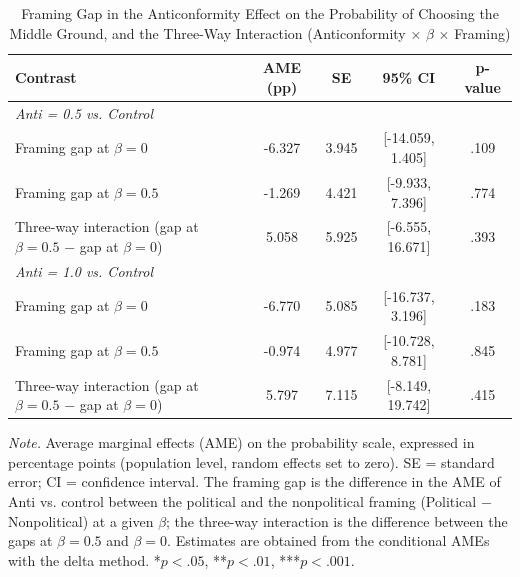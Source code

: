 \begin{table}[H]
\centering
\caption{Framing Gap in the Anticonformity Effect on the Probability of Choosing the Middle Ground, and the Three-Way Interaction (Anticonformity $\times$ $\beta$ $\times$ Framing)}
\label{tab:ame_anti_3way}
\begingroup
\footnotesize
\renewcommand{\arraystretch}{0.90}

\begin{tabularx}{\linewidth}{Xcccc}
\toprule
\textbf{Contrast} & \textbf{AME (pp)} & \textbf{SE} & \textbf{95\% CI} & \textbf{p-value} \\
\midrule
\multicolumn{5}{l}{\textit{Anti = 0.5 vs. Control}} \\
Framing gap at $\beta = 0$ & -6.327 & 3.945 & [-14.059, 1.405] & .109 \\
Framing gap at $\beta = 0.5$ & -1.269 & 4.421 & [-9.933, 7.396] & .774 \\
Three-way interaction (gap at $\beta = 0.5$ $-$ gap at $\beta = 0$) & 5.058 & 5.925 & [-6.555, 16.671] & .393 \\
\multicolumn{5}{l}{\textit{Anti = 1.0 vs. Control}} \\
Framing gap at $\beta = 0$ & -6.770 & 5.085 & [-16.737, 3.196] & .183 \\
Framing gap at $\beta = 0.5$ & -0.974 & 4.977 & [-10.728, 8.781] & .845 \\
Three-way interaction (gap at $\beta = 0.5$ $-$ gap at $\beta = 0$) & 5.797 & 7.115 & [-8.149, 19.742] & .415 \\
\bottomrule
\end{tabularx}

\vspace{0.6em}
{\footnotesize
\setlength{\baselineskip}{12pt}
\textit{Note.} Average marginal effects (AME) on the probability scale, expressed in percentage points (population level, random effects set to zero). SE = standard error; CI = confidence interval. The framing gap is the difference in the AME of Anti vs. control between the political and the nonpolitical framing (Political $-$ Nonpolitical) at a given $\beta$; the three-way interaction is the difference between the gaps at $\beta = 0.5$ and $\beta = 0$. Estimates are obtained from the conditional AMEs with the delta method. *$p < .05$, **$p < .01$, ***$p < .001$.
\par}
\endgroup
\end{table}
